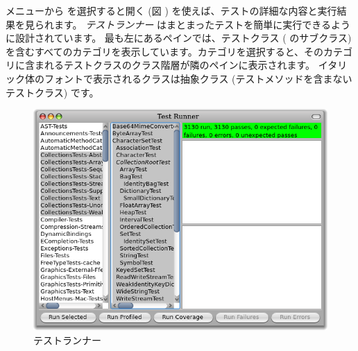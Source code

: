\documentclass[a4paper,10pt,twoside]{book}
\begin{document}
{ メニューから  を選択すると開く \sunit {} (図 ) を使えば、テストの詳細な内容と実行結果を見られます。
\emph{テストランナー} はまとまったテストを簡単に実行できるように設計されています。
最も左にあるペインでは、テストクラス (\ie {} のサブクラス) を含むすべてのカテゴリを表示しています。カテゴリを選択すると、そのカテゴリに含まれるテストクラスのクラス階層が隣のペインに表示されます。
イタリック体のフォントで表示されるクラスは抽象クラス (テストメソッドを含まないテストクラス) です。


\begin{figure}[tbh]
  \begin{center}
	\includegraphics[width=\linewidth]{test-runner}
	\caption{\pharo \sunit テストランナー}
  \end{center}
\end{figure}




}
\end{document}

